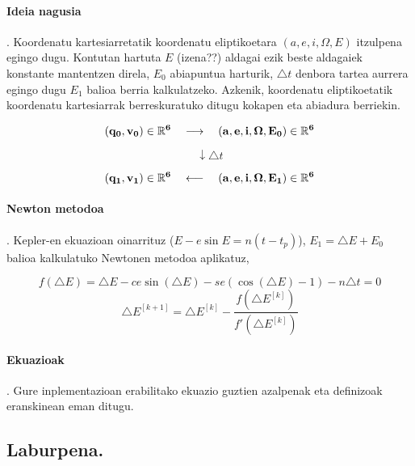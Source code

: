 \paragraph*{\textbf{Ideia nagusia}}. Koordenatu kartesiarretatik koordenatu eliptikoetara $(a,e,i,\Omega,E)$ itzulpena egingo dugu. Kontutan hartuta $E$ (izena??) aldagai ezik beste aldagaiek konstante mantentzen direla, $E_0$ abiapuntua harturik, $\triangle t$ denbora tartea aurrera egingo dugu $E_1$ balioa berria kalkulatzeko. Azkenik, koordenatu eliptikoetatik koordenatu kartesiarrak berreskuratuko ditugu kokapen eta abiadura berriekin. 

\begin{equation*}
(\bf{q_0},\bf{v_0}) \in \mathbb{R}^6 \ \ \ \longrightarrow \ \ \  (a,e,i,\Omega,E_0) \in \mathbb{R}^6 
\end{equation*}

\begin{equation*}
\downarrow \triangle t
\end{equation*}

\begin{equation*}
(\bf{q_1},\bf{v_1}) \in \mathbb{R}^6 \ \ \ \longleftarrow \ \ \  (a,e,i,\Omega,E_1) \in \mathbb{R}^6 
\end{equation*}

\paragraph*{\textbf{Newton metodoa}}. Kepler-en ekuazioan oinarrituz ($E-e\sin E=n (t-t_p)$),  $E_1=\triangle E+E_0$ balioa kalkulatuko Newtonen metodoa aplikatuz,

\begin{equation*}
f(\triangle E)=\triangle E - ce \sin(\triangle E)- se (\cos(\triangle E)-1)-n \triangle t=0
\end{equation*}
\begin{equation}
\triangle E^{[k+1]}=\triangle E^{[k]}- \frac{f(\triangle E^{[k]})}{f'(\triangle E^{[k]})}
\end{equation}

\paragraph*{\textbf{Ekuazioak}}. Gure inplementazioan erabilitako ekuazio guztien azalpenak eta definizoak eranskinean eman ditugu.

\subsection{Laburpena.}

